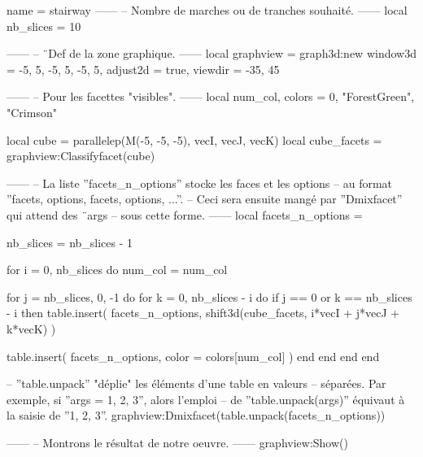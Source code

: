 \documentclass{standalone}
\begin{document}
\begin{luadraw}{name = stairway}
------
-- Nombre de marches ou de tranches souhaité.
------
local nb_slices = 10

------
-- ¨Def de la zone graphique.
------
local graphview = graph3d:new{
  window3d = {-5, 5, -5, 5, -5, 5},
  adjust2d = true,
  viewdir  = {-35, 45}
}

------
-- Pour les facettes "visibles".
------
local num_col, colors = 0, {"ForestGreen", "Crimson"}

local cube        = parallelep(M(-5, -5, -5), vecI, vecJ, vecK)
local cube_facets = graphview:Classifyfacet(cube)

------
-- La liste ''facets_n_options'' stocke les faces et les options
-- au format ''{facets, options, facets, options, ...}''.
-- Ceci sera ensuite mangé par ''Dmixfacet'' qui attend des ¨args
-- sous cette forme.
------
local facets_n_options = {}

nb_slices = nb_slices - 1

for i = 0, nb_slices do
  num_col = num_col%

  for j = nb_slices, 0, -1 do
    for k = 0, nb_slices - i do
      if j == 0 or k == nb_slices - i then
        table.insert(
          facets_n_options,
          shift3d(cube_facets, i*vecI + j*vecJ + k*vecK)
        )

        table.insert(
          facets_n_options,
          {
            color = colors[num_col]
          }
        )
      end
    end
  end
end

-- ''table.unpack'' "déplie" les éléments d'une table en valeurs
-- séparées. Par exemple, si ''args = {1, 2, 3}'', alors l'emploi
-- de ''table.unpack(args)'' équivaut à la saisie de ''1, 2, 3''.
graphview:Dmixfacet(table.unpack(facets_n_options))

------
-- Montrons le résultat de notre oeuvre.
------
graphview:Show()
\end{luadraw}
\end{document}
